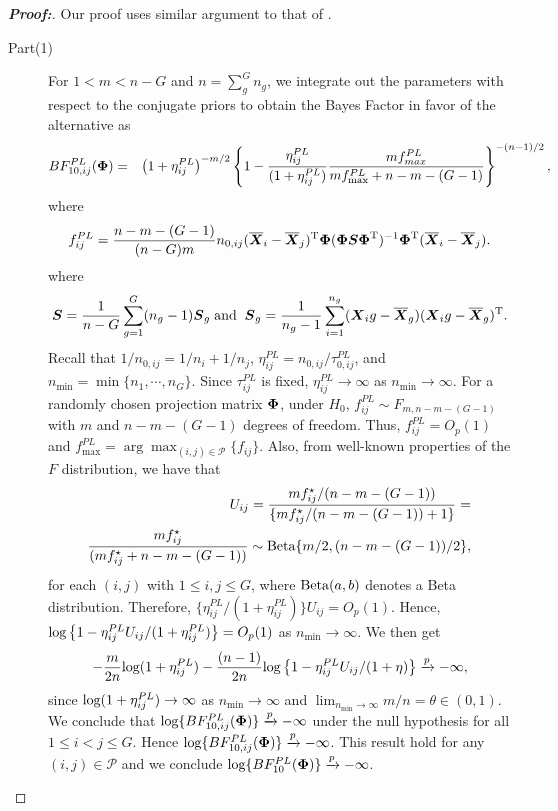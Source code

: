 \documentclass[times,sort&compress,3p]{elsarticle}
\theoremstyle{plain}%
\theoremstyle{definition}
\def\log{\hbox{log}}
\def\Beta{\hbox{Beta}}
\def\log{\hbox{log}}
\def\Beta{\hbox{Beta}}
\def\bse{\begin{eqnarray*}}
\def\ese{\end{eqnarray*}}
\def\be{\begin{eqnarray}}
\def\ee{\end{eqnarray}}
\def\trans{^{\rm T}}
\newcommand{\uS}       {\mbox{\boldmath$S$}}
\newcommand{\uX}       {\mbox{\boldmath$X$}}
\newcommand{\uPhi}              {\mbox{\boldmath$\Phi$}}
\begin{document}
\begin{proof}[\textbf{\upshape Proof:}]
Our proof uses similar argument to that of \citep{zoh2018powerful}.
\begin{description}
\item[Part(1)]
For $1 < m < n - G$ and $n = \sum^{G}_{g}n_g$, we integrate out the parameters with respect to the conjugate priors to obtain the Bayes Factor in favor of the alternative as
\be
BF^{PL}_{10, ij}(\uPhi) &=&\left(1 + \eta^{PL}_{ij} \right)^{-m/2} \left\{ 1 - \frac{\eta^{PL}_{ij}}{(1 + \eta^{PL}_{ij})}\frac{ m f_{max}^{PL}}{ m f_{\max}^{PL}  + n - m - (G-1)} \right\}^{-(n-1)/2} \nonumber,
\ee
where
\bse
f_{ij}^{PL}  = \frac{n - m - (G-1)}{(n-G)m} n_{0,ij}(\overline{\uX}_i - \overline{\uX}_j)\trans \uPhi(\uPhi \uS\uPhi\trans )^{-1}\uPhi\trans (\overline{\uX}_i - \overline{\uX}_j).
\ese
where $$ \uS = \frac{1}{n - G} \sum^{G}_{g=1}(n_g -1)\uS_{g}\; \text{and} \;\; \uS_g = \frac{1}{n_g - 1}\sum^{n_g}_{i=1}(\uX_ig - \overline{\uX}_{g})(\uX_ig - \overline{\uX}_{g})\trans.$$
Recall that $1/n_{0,ij} = 1/n_i + 1/n_j$, $\eta^{PL}_{ij} = n_{0,ij}/\tau^{PL}_{0,ij}$, and $n_{\min} = \min\{n_1, \cdots, n_G\}$.
Since $\tau^{PL}_{ij}$ is fixed, $\eta^{PL}_{ij} \rightarrow \infty$ as $n_{\min} \to \infty$.
For a randomly chosen projection matrix $\uPhi$, under $H_{0}$, $f^{PL}_{ij}  \sim F_{m, n-m-(G-1)}$ with $m$ and $n - m -(G-1)$ degrees of freedom.
Thus, $f^{PL}_{ij} = O_{p}(1)$ and $f^{PL}_{\max} = \arg\max_{(i,j) \in \mathcal{P}}\{ f_{ij}\}$.
Also, from well-known properties of the $F$ distribution, we have that
\bse
U_{ij} = \frac{m f_{ij}^{\star}/(n-m-(G-1) )}{\{m f_{ij}^{\star}/(n-m- (G-1) ) + 1\}} = \nonumber \\
  \frac{m f_{ij}^{\star}}{( m f_{ij}^{\star} +n-m- (G-1))} \sim \Beta\{m/2, (n-m-(G-1))/2 \},
\ese
for each $(i,j)$ with $1 \leq i, j \leq G$, where $\Beta(a, b)$ denotes a Beta distribution.
Therefore, $\{\eta^{PL}_{ij}/(1 + \eta^{PL}_{ij})\} U_{ij} = O_{p}(1)$.
Hence, $\log\left\{ 1 -  \eta^{PL}_{ij} U_{ij}/(1 + \eta^{PL}_{ij}) \right\} = O_{p}(1)$ as $n_{\min} \to \infty$. We then get
\bse
-\frac{m}{2n}\log(1 + \eta^{PL}_{ij}) -\frac{(n-1)}{2n}\log\left\{ 1 -  \eta^{PL}_{ij} U_{ij}/(1 + \eta) \right\} \xrightarrow[]{p} -\infty,
\ese
since $\log(1 + \eta^{PL}_{ij}) \rightarrow \infty$ as $n_{\min} \rightarrow \infty$ and $\lim_{n_{\min} \rightarrow \infty} m/n = \theta \in (0, 1)$.
We conclude that $\log\{BF^{PL}_{10,ij}(\uPhi)\} \xrightarrow[]{p} -\infty$ under the null hypothesis for all $1 \leq i < j \leq G$.
Hence $\log\{BF^{PL}_{10,ij}(\uPhi)\} \xrightarrow[]{p} -\infty$. This result hold for any $(i,j) \in \mathcal{P}$ and we conclude $\log\{BF^{PL}_{10}(\uPhi)\} \xrightarrow[]{p} -\infty$.


\end{description}
\end{proof}
\end{document}
